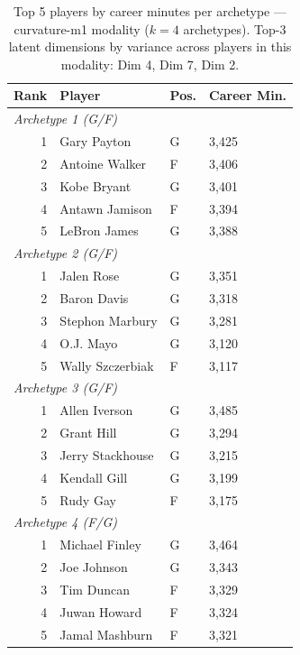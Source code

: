 \begin{table}[htbp]
  \centering\small
  \begin{tabular}{rlll}
    \toprule
    Rank & Player & Pos. & Career Min. \\
    \midrule
    \multicolumn{4}{l}{\textit{Archetype 1 (G/F)}} \\
    \midrule
    1 & Gary Payton & G & 3,425 \\
    2 & Antoine Walker & F & 3,406 \\
    3 & Kobe Bryant & G & 3,401 \\
    4 & Antawn Jamison & F & 3,394 \\
    5 & LeBron James & G & 3,388 \\
    \midrule[0.4pt]
    \multicolumn{4}{l}{\textit{Archetype 2 (G/F)}} \\
    \midrule
    1 & Jalen Rose & G & 3,351 \\
    2 & Baron Davis & G & 3,318 \\
    3 & Stephon Marbury & G & 3,281 \\
    4 & O.J. Mayo & G & 3,120 \\
    5 & Wally Szczerbiak & F & 3,117 \\
    \midrule[0.4pt]
    \multicolumn{4}{l}{\textit{Archetype 3 (G/F)}} \\
    \midrule
    1 & Allen Iverson & G & 3,485 \\
    2 & Grant Hill & G & 3,294 \\
    3 & Jerry Stackhouse & G & 3,215 \\
    4 & Kendall Gill & G & 3,199 \\
    5 & Rudy Gay & F & 3,175 \\
    \midrule[0.4pt]
    \multicolumn{4}{l}{\textit{Archetype 4 (F/G)}} \\
    \midrule
    1 & Michael Finley & G & 3,464 \\
    2 & Joe Johnson & G & 3,343 \\
    3 & Tim Duncan & F & 3,329 \\
    4 & Juwan Howard & F & 3,324 \\
    5 & Jamal Mashburn & F & 3,321 \\
    \bottomrule
  \end{tabular}
  \caption{Top 5 players by career minutes per archetype --- curvature-m1 modality ($k=4$ archetypes). Top-3 latent dimensions by variance across players in this modality: Dim 4, Dim 7, Dim 2.}
  \label{tab:arch_reps_curvature_m1}
\end{table}

